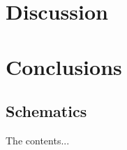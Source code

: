 \documentclass[a4paper,11pt]{article}
\begin{document}
\section{Discussion}



\section{Conclusions}


\begin{appendices}
\section{Schematics}
The contents...
\end{appendices}


\newpage
\printbibliography 
\end{document}
